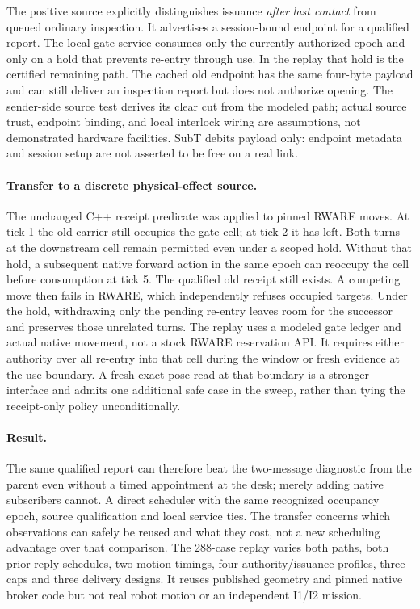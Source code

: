 \documentclass{article}
\begin{document}
The positive source explicitly distinguishes issuance \emph{after last
contact} from queued ordinary inspection. It advertises a session-bound
endpoint for a qualified report. The local gate service consumes only the
currently authorized epoch and only on a hold that prevents re-entry
through use. In the replay that hold is the certified remaining path.
The cached old endpoint has the same four-byte payload and can still
deliver an inspection report but does not authorize opening. The
sender-side source test derives its clear cut from the modeled path;
actual source trust, endpoint binding, and local interlock wiring are
assumptions, not demonstrated hardware facilities. SubT debits payload
only: endpoint metadata and session setup are not asserted to be free on
a real link.

\paragraph{Transfer to a discrete physical-effect source.}
The unchanged C++ receipt predicate was applied to pinned RWARE moves.
At tick 1 the old carrier still occupies the gate cell; at tick 2 it
has left. Both turns at the downstream cell remain permitted even under
a scoped hold. Without that hold, a subsequent native forward action
in the same epoch can reoccupy the cell before consumption at tick 5.
The qualified old receipt still exists. A competing move then fails in
RWARE, which independently refuses occupied targets. Under the hold,
withdrawing only the pending re-entry leaves room for the successor
and preserves those unrelated turns. The replay uses a modeled gate
ledger and actual native movement, not a stock RWARE reservation API.
It requires either authority over all re-entry into that cell during
the window or fresh evidence at the use boundary. A fresh exact
pose read at that boundary is a stronger interface and admits one
additional safe case in the sweep, rather than tying the receipt-only
policy unconditionally.

\paragraph{Result.}
The same qualified report can therefore beat the two-message diagnostic
from the parent even without a timed appointment at the desk; merely
adding native subscribers cannot. A direct scheduler with the same
recognized occupancy epoch, source qualification and local service ties.
The transfer concerns which observations can safely be reused and what
they cost, not a new scheduling advantage over that comparison.
The 288-case replay varies both paths, both prior reply schedules, two
motion timings, four authority/issuance profiles, three caps and three
delivery designs. It reuses published geometry and pinned native broker
code but not real robot motion or an independent I1/I2 mission.
\end{document}
